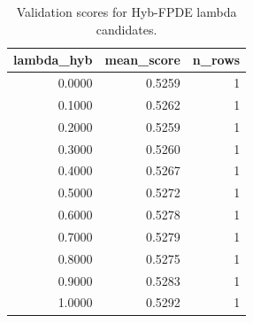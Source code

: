 \begin{table}[t]
\caption{Validation scores for Hyb-FPDE lambda candidates.}
\label{tab:lambda_distribution_computed}
\centering
\begin{tabular}{rrr}
\toprule
lambda\_hyb & mean\_score & n\_rows \\
\midrule
0.0000 & 0.5259 & 1 \\
0.1000 & 0.5262 & 1 \\
0.2000 & 0.5259 & 1 \\
0.3000 & 0.5260 & 1 \\
0.4000 & 0.5267 & 1 \\
0.5000 & 0.5272 & 1 \\
0.6000 & 0.5278 & 1 \\
0.7000 & 0.5279 & 1 \\
0.8000 & 0.5275 & 1 \\
0.9000 & 0.5283 & 1 \\
1.0000 & 0.5292 & 1 \\
\bottomrule
\end{tabular}

\end{table}
